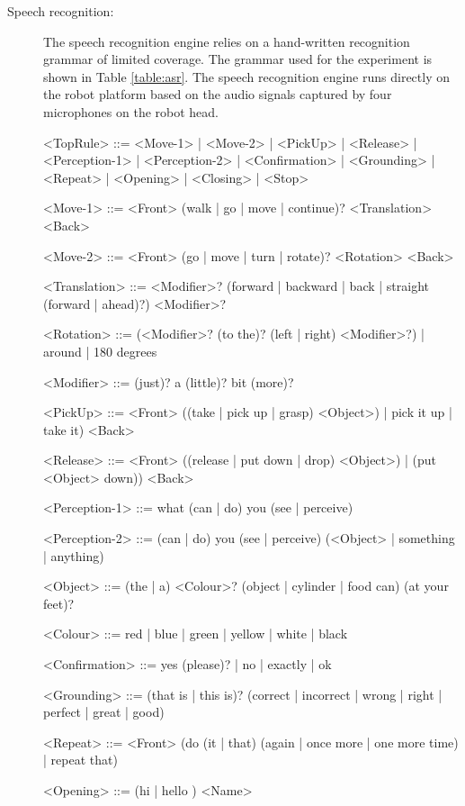 \begin{description}
\item[Speech recognition: ] The speech recognition engine relies on a hand-written recognition grammar of limited coverage. The grammar used for the experiment is shown in Table \ref{table:asr}.  The speech recognition engine runs directly on the robot platform based on the audio signals captured by four microphones on the robot head.


\begin{table}[p!]
\vspace{2cm}
\begin{grammar}

<TopRule> ::= <Move-1> | <Move-2> | <PickUp> | <Release> | <Perception-1> | <Perception-2> | <Confirmation> | <Grounding> | <Repeat> | <Opening> | <Closing> | <Stop> 

<Move-1> ::= <Front> (walk | go | move | continue)? <Translation> <Back>

<Move-2> ::= <Front> (go | move | turn | rotate)? <Rotation> <Back>

<Translation> ::= <Modifier>? (forward | backward | back | straight (forward | ahead)?) <Modifier>?

<Rotation> ::= (<Modifier>? (to the)? (left | right) <Modifier>?) | around | 180 degrees

<Modifier> ::= (just)? a (little)? bit (more)? 

<PickUp> ::= <Front> ((take | pick up | grasp) <Object>) | pick it up | take it) <Back>

<Release> ::= <Front> ((release | put down | drop) <Object>) | (put <Object> down)) <Back> 

<Perception-1> ::= what (can | do) you (see | perceive)

<Perception-2> ::= (can | do) you (see | perceive) (<Object> | something | anything)

<Object> ::= (the | a) <Colour>? (object | cylinder | food can) (at your feet)? 

<Colour> ::= red | blue | green | yellow | white | black 

<Confirmation> ::= yes (please)? | no | exactly | ok 

<Grounding> ::= (that is | this is)? (correct  | incorrect | wrong | right | perfect | great | good) 

<Repeat> ::= <Front> (do (it | that) (again | once more | one more time) | repeat that)

<Opening> ::= (hi | hello ) <Name>


\end{grammar}
\end{table}
\end{description}
